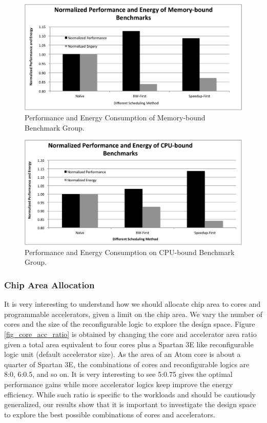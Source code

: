 \begin{figure}
    \centering
    \includegraphics[width=4.5in]{Memory-Bounded}
    \caption{Performance and Energy Consumption of Memory-bound Benchmark Group.}
    \label{fig_mem_bound}
\end{figure}

\begin{figure}
    \centering
    \includegraphics[width=4.5in]{CPU-Bounded}
    \caption{Performance and Energy Consumption on CPU-bound Benchmark Group.}
    \label{fig_cpu_bound}
\end{figure}


\subsubsection{Chip Area Allocation}

It is very interesting to understand how we should allocate chip
area to cores and programmable accelerators, given a limit on the chip
area. We vary the number of cores and the size of the
reconfigurable logic to explore the design space. Figure
\ref{fig_core_acc_ratio} is obtained by changing the core and
accelerator area ratio given a total area equivalent to four cores
plus a Spartan 3E like reconfigurable logic unit (default
accelerator size). As the area of an Atom core is about
    a quarter of Spartan 3E, the combinations of cores and reconfigurable
logics are 8:0, 6:0.5, and so on. It is very interesting to see
 5:0.75 gives the optimal performance gains while more accelerator
logics keep improve the energy efficiency. While such ratio is
specific to the workloads and should be cautiously generalized, 
our results show that it is important to
investigate the design space to explore the best possible
combinations of cores and accelerators. 

